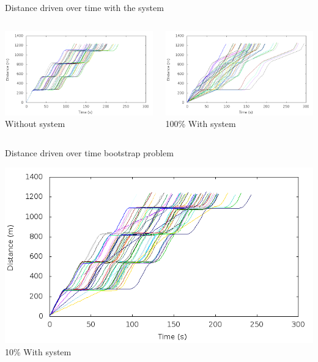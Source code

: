 	
\begin{frame}{Distance driven over time with the system}
\begin{columns}
	\begin{column}{0.5\textwidth}
	\includegraphics[width=1\textwidth]{images/tp0/distance0.png}\\
	Without system
	\end{column}
	\begin{column}{0.5\textwidth}
	\includegraphics[width=1\textwidth]{images/tp0/distance100.png}\\
	100\% With system
	\end{column}
\end{columns}
\end{frame}


\begin{frame}{Distance driven over time bootstrap problem}

\includegraphics[width=1\textwidth]{images/tp0/distance10.png}\\
10\% With system
\end{frame}


